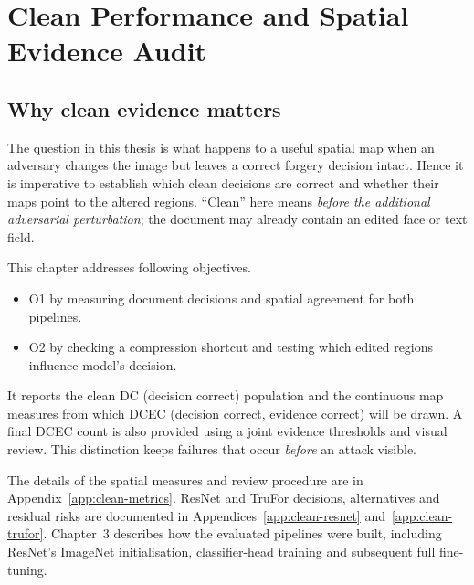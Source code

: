 
\chapter{Clean Performance and Spatial Evidence Audit}
\label{ch:clean}

\section{Why clean evidence matters}
\label{sec:clean-purpose}

The question in this thesis is what happens to a useful spatial map when an adversary changes the image but leaves a correct forgery decision intact. Hence it is imperative to establish which clean decisions are correct and whether their maps point to the altered regions. ``Clean'' here means \emph{before the additional adversarial perturbation}; the document may already contain an edited face or text field.

This chapter addresses following objectives. 
\begin{itemize}
    \item O1 by measuring document decisions and spatial agreement for both pipelines.
    \item O2 by checking a compression shortcut and testing which edited regions influence model's decision.
\end{itemize}

It reports the clean DC (decision correct) population and the continuous map measures from which DCEC (decision correct, evidence correct) will be drawn. A final DCEC count is also provided using a joint evidence thresholds and visual review. This distinction keeps failures that occur \emph{before} an attack visible.

The details of the spatial measures and review procedure are in Appendix~\ref{app:clean-metrics}. ResNet and TruFor decisions, alternatives and residual risks are documented in Appendices~\ref{app:clean-resnet} and~\ref{app:clean-trufor}. Chapter~3 describes how the evaluated pipelines were built, including ResNet's ImageNet initialisation, classifier-head training and subsequent full fine-tuning.

